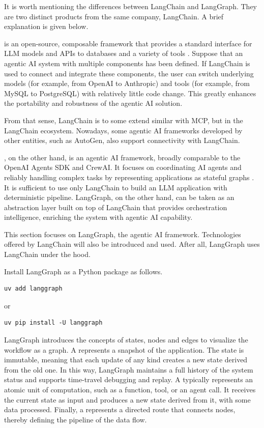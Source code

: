 It is worth mentioning the differences between LangChain and LangGraph. They are two distinct products from the same company, LangChain. A brief explanation is given below.

 is an open-source, composable framework that provides a standard interface for LLM models and APIs to databases and a variety of tools \cite{langchain2025}. Suppose that an agentic AI system with multiple components has been defined. If LangChain is used to connect and integrate these components, the user can switch underlying models (for example, from OpenAI to Anthropic) and tools (for example, from MySQL to PostgreSQL) with relatively little code change. This greatly enhances the portability and robustness of the agentic AI solution.

From that sense, LangChain is to some extend similar with MCP, but in the LangChain ecosystem. Nowadays, some agentic AI frameworks developed by other entities, such as AutoGen, also support connectivity with LangChain.

, on the other hand, is an agentic AI framework, broadly comparable to the OpenAI Agents SDK and CrewAI. It focuses on coordinating AI agents and reliably handling complex tasks by representing applications as stateful graphs \cite{langchain2025langgraph}. It is sufficient to use only LangChain to build an LLM application with deterministic pipeline. LangGraph, on the other hand, can be taken as an abstraction layer built on top of LangChain that provides orchestration intelligence, enriching the system with agentic AI capability.

This section focuses on LangGraph, the agentic AI framework. Technologies offered by LangChain will also be introduced and used. After all, LangGraph uses LangChain under the hood.

Install LangGraph as a Python package as follows.
\begin{lstlisting}
uv add langgraph
\end{lstlisting}
or
\begin{lstlisting}
uv pip install -U langgraph
\end{lstlisting}

LangGraph introduces the concepts of states, nodes and edges to visualize the workflow as a graph. A  represents a snapshot of the application. The state is immutable, meaning that each update of any kind creates a new state derived from the old one. In this way, LangGraph maintains a full history of the system status and supports time-travel debugging and replay. A  typically represents an atomic unit of computation, such as a function, tool, or an agent call. It receives the current state as input and produces a new state derived from it, with some data processed. Finally, a  represents a directed route that connects nodes, thereby defining the pipeline of the data flow.


